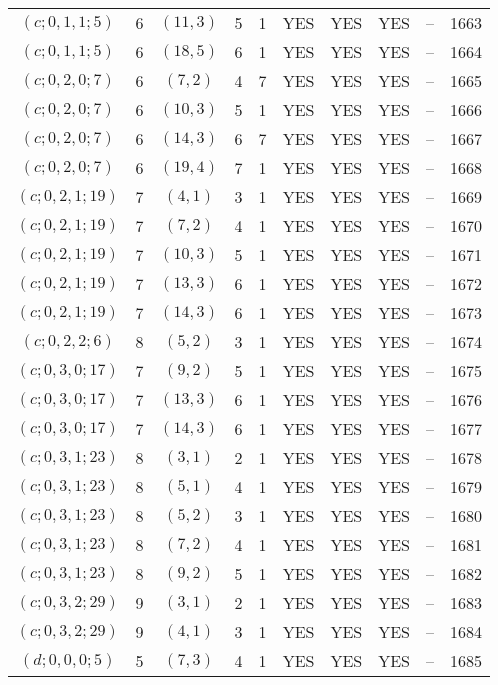 \begin{longtable}{|c|c|c|c|c|c|c|c|c|c|}
$(c; 0, 1, 1; 5)$ & 6 & $(11, 3)$ & 5 & 1 & YES & YES & YES & -- & 1663\\
$(c; 0, 1, 1; 5)$ & 6 & $(18, 5)$ & 6 & 1 & YES & YES & YES & -- & 1664\\
$(c; 0, 2, 0; 7)$ & 6 & $(7, 2)$ & 4 & 7 & YES & YES & YES & -- & 1665\\
$(c; 0, 2, 0; 7)$ & 6 & $(10, 3)$ & 5 & 1 & YES & YES & YES & -- & 1666\\
$(c; 0, 2, 0; 7)$ & 6 & $(14, 3)$ & 6 & 7 & YES & YES & YES & -- & 1667\\
$(c; 0, 2, 0; 7)$ & 6 & $(19, 4)$ & 7 & 1 & YES & YES & YES & -- & 1668\\
$(c; 0, 2, 1; 19)$ & 7 & $(4, 1)$ & 3 & 1 & YES & YES & YES & -- & 1669\\
$(c; 0, 2, 1; 19)$ & 7 & $(7, 2)$ & 4 & 1 & YES & YES & YES & -- & 1670\\
$(c; 0, 2, 1; 19)$ & 7 & $(10, 3)$ & 5 & 1 & YES & YES & YES & -- & 1671\\
$(c; 0, 2, 1; 19)$ & 7 & $(13, 3)$ & 6 & 1 & YES & YES & YES & -- & 1672\\
$(c; 0, 2, 1; 19)$ & 7 & $(14, 3)$ & 6 & 1 & YES & YES & YES & -- & 1673\\
$(c; 0, 2, 2; 6)$ & 8 & $(5, 2)$ & 3 & 1 & YES & YES & YES & -- & 1674\\
$(c; 0, 3, 0; 17)$ & 7 & $(9, 2)$ & 5 & 1 & YES & YES & YES & -- & 1675\\
$(c; 0, 3, 0; 17)$ & 7 & $(13, 3)$ & 6 & 1 & YES & YES & YES & -- & 1676\\
$(c; 0, 3, 0; 17)$ & 7 & $(14, 3)$ & 6 & 1 & YES & YES & YES & -- & 1677\\
$(c; 0, 3, 1; 23)$ & 8 & $(3, 1)$ & 2 & 1 & YES & YES & YES & -- & 1678\\
$(c; 0, 3, 1; 23)$ & 8 & $(5, 1)$ & 4 & 1 & YES & YES & YES & -- & 1679\\
$(c; 0, 3, 1; 23)$ & 8 & $(5, 2)$ & 3 & 1 & YES & YES & YES & -- & 1680\\
$(c; 0, 3, 1; 23)$ & 8 & $(7, 2)$ & 4 & 1 & YES & YES & YES & -- & 1681\\
$(c; 0, 3, 1; 23)$ & 8 & $(9, 2)$ & 5 & 1 & YES & YES & YES & -- & 1682\\
$(c; 0, 3, 2; 29)$ & 9 & $(3, 1)$ & 2 & 1 & YES & YES & YES & -- & 1683\\
$(c; 0, 3, 2; 29)$ & 9 & $(4, 1)$ & 3 & 1 & YES & YES & YES & -- & 1684\\
$(d; 0, 0, 0; 5)$ & 5 & $(7, 3)$ & 4 & 1 & YES & YES & YES & -- & 1685\\

\end{longtable}
